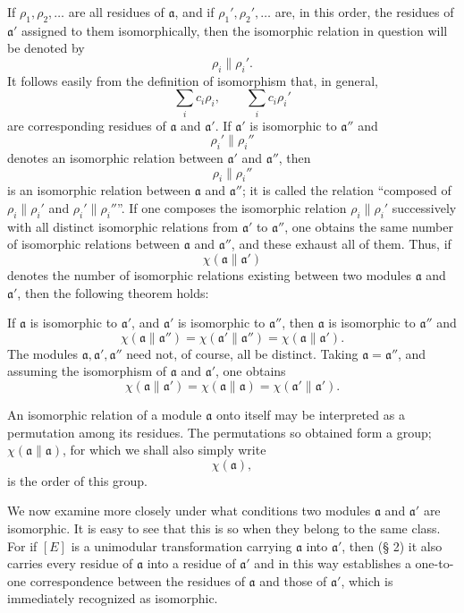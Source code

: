If $\rho_1,\rho_2,\ldots$ are all residues of $\mathfrak a$, and if $\rho_1',\rho_2',\ldots$ are, in this order, the residues of $\mathfrak a'$ assigned to them isomorphically, then the isomorphic relation in question will be denoted by
\[
 \rho_i\parallel \rho_i'.
\]
It follows easily from the definition of isomorphism that, in general,
\[
 \sum_i c_i\rho_i,
 \qquad
 \sum_i c_i\rho_i'
\]
are corresponding residues of $\mathfrak a$ and $\mathfrak a'$. If $\mathfrak a'$ is isomorphic to $\mathfrak a''$ and
\[
 \rho_i'\parallel \rho_i''
\]
denotes an isomorphic relation between $\mathfrak a'$ and $\mathfrak a''$, then
\[
 \rho_i\parallel \rho_i''
\]
is an isomorphic relation between $\mathfrak a$ and $\mathfrak a''$; it is called the relation ``composed of $\rho_i\parallel\rho_i'$ and $\rho_i'\parallel\rho_i''$''. If one composes the isomorphic relation $\rho_i\parallel\rho_i'$ successively with all distinct isomorphic relations from $\mathfrak a'$ to $\mathfrak a''$, one obtains the same number of isomorphic relations between $\mathfrak a$ and $\mathfrak a''$, and these exhaust all of them. Thus, if
\[
 \chi(\mathfrak a\parallel\mathfrak a')
\]
denotes the number of isomorphic relations existing between two modules $\mathfrak a$ and $\mathfrak a'$, then the following theorem holds:

If $\mathfrak a$ is isomorphic to $\mathfrak a'$, and $\mathfrak a'$ is isomorphic to $\mathfrak a''$, then $\mathfrak a$ is isomorphic to $\mathfrak a''$ and
\[
 \chi(\mathfrak a\parallel\mathfrak a'')=
 \chi(\mathfrak a'\parallel\mathfrak a'')=
 \chi(\mathfrak a\parallel\mathfrak a').
\]
The modules $\mathfrak a,\mathfrak a',\mathfrak a''$ need not, of course, all be distinct. Taking $\mathfrak a=\mathfrak a''$, and assuming the isomorphism of $\mathfrak a$ and $\mathfrak a'$, one obtains
\[
 \chi(\mathfrak a\parallel\mathfrak a')=
 \chi(\mathfrak a\parallel\mathfrak a)=
 \chi(\mathfrak a'\parallel\mathfrak a').
\]

An isomorphic relation of a module $\mathfrak a$ onto itself may be interpreted as a permutation among its residues. The permutations so obtained form a group; $\chi(\mathfrak a\parallel\mathfrak a)$, for which we shall also simply write
\[
 \chi(\mathfrak a),
\]
is the order of this group.

We now examine more closely under what conditions two modules $\mathfrak a$ and $\mathfrak a'$ are isomorphic. It is easy to see that this is so when they belong to the same class. For if $[E]$ is a unimodular transformation carrying $\mathfrak a$ into $\mathfrak a'$, then (§ 2) it also carries every residue of $\mathfrak a$ into a residue of $\mathfrak a'$ and in this way establishes a one-to-one correspondence between the residues of $\mathfrak a$ and those of $\mathfrak a'$, which is immediately recognized as isomorphic.

